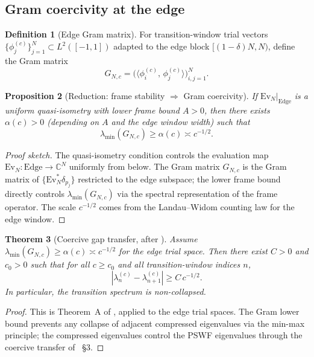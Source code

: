 \documentclass[12pt,a4paper]{amsart}
\newtheorem{theorem}{Theorem}[section]
\newtheorem{proposition}[theorem]{Proposition}
\theoremstyle{definition}
\newtheorem{definition}[theorem]{Definition}
\newcommand{\Ev}{\mathrm{Ev}_N}
\newcommand{\ip}[2]{\langle #1,\, #2\rangle}
\begin{document}
\subsection{Gram coercivity at the edge}

\begin{definition}[Edge Gram matrix]
For transition-window trial vectors
$\{\phi_j^{(c)}\}_{j=1}^N \subset L^2([-1,1])$
adapted to the edge block $[(1-\delta)N, N)$, define
the Gram matrix
\[
  G_{N,c}
  = \bigl(\ip{\phi_i^{(c)}}{\phi_j^{(c)}}\bigr)_{i,j=1}^N.
\]
\end{definition}

\begin{proposition}[Reduction: frame stability $\Rightarrow$
Gram coercivity]\label{prop:frame_to_gram}
If $\Ev|_{\mathrm{Edge}}$ is a uniform quasi-isometry with
lower frame bound $A > 0$, then there exists $\alpha(c) > 0$
(depending on $A$ and the edge window width) such that
\[
  \lambda_{\min}(G_{N,c}) \ge \alpha(c) \asymp c^{-1/2}.
\]
\end{proposition}

\begin{proof}[Proof sketch]
The quasi-isometry condition controls the evaluation map
$\Ev: \mathrm{Edge} \to \mathbb{C}^N$ uniformly from below.
The Gram matrix $G_{N,c}$ is the Gram matrix of
$\{\Ev^*\delta_{p_j}\}$ restricted to the edge subspace;
the lower frame bound directly controls $\lambda_{\min}(G_{N,c})$
via the spectral representation of the frame operator.
The scale $c^{-1/2}$ comes from the Landau--Widom counting
law for the edge window.
\end{proof}

\begin{theorem}[Coercive gap transfer, after \cite{Paper13b}]%
\label{thm:gram_gap}
Assume $\lambda_{\min}(G_{N,c}) \ge \alpha(c) \asymp c^{-1/2}$
for the edge trial space.
Then there exist $C>0$ and $c_0 > 0$ such that for all
$c \ge c_0$ and all transition-window indices $n$,
\begin{equation}\label{eq:gap_lower}
  |\lambda_n^{(c)} - \lambda_{n+1}^{(c)}|
  \ge C\, c^{-1/2}.
\end{equation}
In particular, the transition spectrum is non-collapsed.
\end{theorem}

\begin{proof}
This is Theorem~A of \cite{Paper13b}, applied to the
edge trial spaces.
The Gram lower bound prevents any collapse of adjacent
compressed eigenvalues via the min-max principle;
the compressed eigenvalues control the PSWF eigenvalues
through the coercive transfer of \cite{Paper13b}~\S3.
\end{proof}
\end{document}
